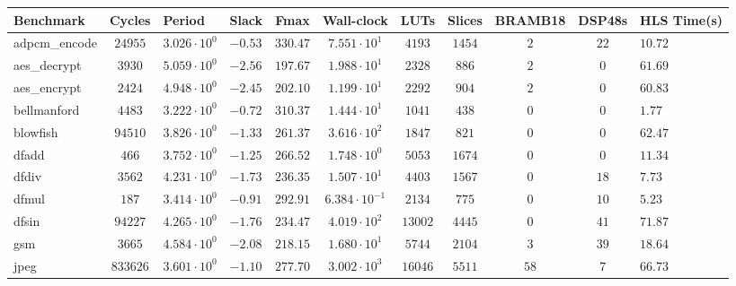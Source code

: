 \begin{tabular}{|l|c|HHc|c|c|c|c|cH|}
\hline
Benchmark     & Cycles       & Period                 & Slack     & Fmax       & Wall-clock              & LUTs      & Slices    & BRAMB18 & DSP48s  & HLS Time(s) \\
\hline
adpcm\_encode & $ 24955    $ & $ 3.026 \cdot 10^{0} $ & $ -0.53 $ & $ 330.47 $ & $ 7.551 \cdot 10^{1}  $ & $ 4193  $ & $ 1454  $ & $ 2   $ & $ 22  $ & $ 10.72   $ \\
aes\_decrypt  & $ 3930     $ & $ 5.059 \cdot 10^{0} $ & $ -2.56 $ & $ 197.67 $ & $ 1.988 \cdot 10^{1}  $ & $ 2328  $ & $ 886   $ & $ 2   $ & $ 0   $ & $ 61.69   $ \\
aes\_encrypt  & $ 2424     $ & $ 4.948 \cdot 10^{0} $ & $ -2.45 $ & $ 202.10 $ & $ 1.199 \cdot 10^{1}  $ & $ 2292  $ & $ 904   $ & $ 2   $ & $ 0   $ & $ 60.83   $ \\
bellmanford   & $ 4483     $ & $ 3.222 \cdot 10^{0} $ & $ -0.72 $ & $ 310.37 $ & $ 1.444 \cdot 10^{1}  $ & $ 1041  $ & $ 438   $ & $ 0   $ & $ 0   $ & $ 1.77    $ \\
blowfish      & $ 94510    $ & $ 3.826 \cdot 10^{0} $ & $ -1.33 $ & $ 261.37 $ & $ 3.616 \cdot 10^{2}  $ & $ 1847  $ & $ 821   $ & $ 0   $ & $ 0   $ & $ 62.47   $ \\
dfadd         & $ 466      $ & $ 3.752 \cdot 10^{0} $ & $ -1.25 $ & $ 266.52 $ & $ 1.748 \cdot 10^{0}  $ & $ 5053  $ & $ 1674  $ & $ 0   $ & $ 0   $ & $ 11.34   $ \\
dfdiv         & $ 3562     $ & $ 4.231 \cdot 10^{0} $ & $ -1.73 $ & $ 236.35 $ & $ 1.507 \cdot 10^{1}  $ & $ 4403  $ & $ 1567  $ & $ 0   $ & $ 18  $ & $ 7.73    $ \\
dfmul         & $ 187      $ & $ 3.414 \cdot 10^{0} $ & $ -0.91 $ & $ 292.91 $ & $ 6.384 \cdot 10^{-1} $ & $ 2134  $ & $ 775   $ & $ 0   $ & $ 10  $ & $ 5.23    $ \\
dfsin         & $ 94227    $ & $ 4.265 \cdot 10^{0} $ & $ -1.76 $ & $ 234.47 $ & $ 4.019 \cdot 10^{2}  $ & $ 13002 $ & $ 4445  $ & $ 0   $ & $ 41  $ & $ 71.87   $ \\
gsm           & $ 3665     $ & $ 4.584 \cdot 10^{0} $ & $ -2.08 $ & $ 218.15 $ & $ 1.680 \cdot 10^{1}  $ & $ 5744  $ & $ 2104  $ & $ 3   $ & $ 39  $ & $ 18.64   $ \\
jpeg          & $ 833626   $ & $ 3.601 \cdot 10^{0} $ & $ -1.10 $ & $ 277.70 $ & $ 3.002 \cdot 10^{3}  $ & $ 16046 $ & $ 5511  $ & $ 58  $ & $ 7   $ & $ 66.73   $ \\

\end{tabular}
